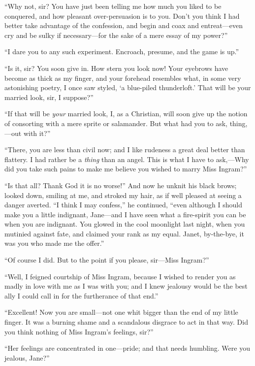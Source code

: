 \enquote{Why not, sir?  You have just been telling me how much you liked
	to be conquered, and how pleasant over-persuasion is to you.  Don't you
	think I had better take advantage of the confession, and begin and coax
	and entreat---even cry and be sulky if necessary---for the sake of a
	mere essay of my power?}

\enquote{I dare you to any such experiment.  Encroach, presume, and the
	game is up.}

\enquote{Is it, sir?  You soon give in.  How stern you look now!  Your
	eyebrows have become as thick as my finger, and your forehead resembles
	what, in some very astonishing poetry, I once saw styled, \enquote{a
		blue-piled thunderloft.}  That will be your married look, sir, I
	suppose?}

\enquote{If that will be \emph{your} married look, I, as a Christian, will soon
	give up the notion of consorting with a mere sprite or salamander.  But
	what had you to ask, thing,---out with it?}

\enquote{There, you are less than civil now; and I like rudeness a great deal
	better than flattery.  I had rather be a \emph{thing} than an angel.
	This is what I have to ask,---Why did you take such pains to make me
	believe you wished to marry Miss Ingram?}

\enquote{Is that all?  Thank God it is no worse!}  And now he unknit his
black brows; looked down, smiling at me, and stroked my hair, as if well
pleased at seeing a danger averted.  \enquote{I think I may confess,} he
continued, \enquote{even although I should make you a little indignant,
	Jane---and I have seen what a fire-spirit you can be when you are
	indignant.  You glowed in the cool moonlight last night, when you
	mutinied against fate, and claimed your rank as my equal.  Janet,
	by-the-bye, it was you who made me the offer.}

\enquote{Of course I did.  But to the point if you please, sir---Miss
	Ingram?}

\enquote{Well, I feigned courtship of Miss Ingram, because I wished to
	render you as madly in love with me as I was with you; and I knew
	jealousy would be the best ally I could call in for the furtherance of
	that end.}

\enquote{Excellent!  Now you are small---not one whit bigger than the
	end of my little finger.  It was a burning shame and a scandalous
	disgrace to act in that way.  Did you think nothing of Miss Ingram's
	feelings, sir?}

\enquote{Her feelings are concentrated in one---pride; and that needs
	humbling.  Were you jealous, Jane?}

